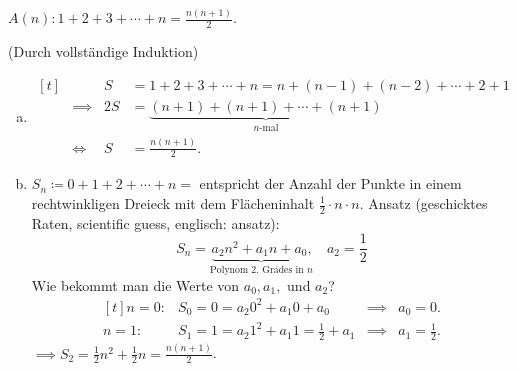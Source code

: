 \documentclass[../ana1.tex]{subfiles}
\begin{document}
\begin{bsp}
	\(A(n): 1+2+3+\cdots+n = \frac{n(n+1)}{2}\).
	\begin{bew} (Durch vollständige Induktion)
	\end{bew}
\end{bsp}
\begin{bem}\leavevmode
	\begin{enumerate}[(a)]
		\item \(\begin{aligned}[t]
				&	         		 & S &= 1 + 2 + 3 + \cdots + n = n + (n-1)+ (n-2) + \cdots + 2 + 1\\
				&\implies 		     &2S &= \underbrace{(n+1)+(n+1)+\cdots+(n+1)}_{n\text{-mal}}\\
				&\Longleftrightarrow & S &= \frac{n(n+1)}{2}.
			  \end{aligned}\)
		\item \( S_{n} \coloneqq 0 + 1 + 2 + \cdots + n = \) entspricht der Anzahl der Punkte in einem 
			  rechtwinkligen Dreieck mit dem Flächeninhalt \(\frac{1}{2}\cdot n \cdot n\).\newline
			  Ansatz (\glqq{}geschicktes Raten\grqq, \glqq{}scientific guess\grqq, englisch: ansatz):
			  \[S_{n} = \underbrace{a_{2}n^{2} + a_{1}n + a_{0}\text{,}}_{\text{Polynom }2\text{. Grades in }n}\quad a_{2} = \frac{1}{2}\]
			  Wie bekommt man die Werte von \(a_0, a_1,\) und \(a_2\)?
			  \[\begin{aligned}[t]
				n=0\colon& S_{0} = 0 = a_{2}0^{2} + a_{1}0 + a_{0}               &\implies& a_{0} = 0.\\ 
				n=1\colon& S_{1} = 1 = a_{2}1^{2} + a_{1}1 = \frac{1}{2} + a_{1} &\implies& a_{1} = \frac{1}{2}.
			  \end{aligned}\]
			  \(\implies S_{2} = \frac{1}{2}n^{2} + \frac{1}{2}n = \frac{n(n+1)}{2}\).
	\end{enumerate}
\end{bem}
\end{document}
